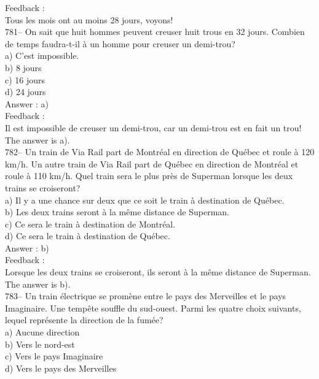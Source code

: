 ﻿\documentclass[letterpaper, 12pt]{article}
\begin{document}
Feedback : \\
Tous les mois ont au moins 28 jours, voyons!  \\

781-- On sait que huit hommes peuvent creuser huit trous en 32 jours.
Combien de temps faudra-t-il \`a un homme pour creuser un demi-trou?\\
a) C'est impossible.\\
b) 8 jours\\
c) 16 jours\\
d) 24 jours\\

Answer : a)\\

Feedback : \\
Il est impossible de creuser un demi-trou, car un demi-trou est en fait un
trou!  The answer is a).\\

782-- Un train de Via Rail part de Montr\'eal en direction de Qu\'ebec et
roule \`a 120 km/h.  Un autre train de Via Rail part de Qu\'ebec en
direction de Montr\'eal et roule \`a 110 km/h.  Quel train sera le plus
pr\`es de Superman lorsque les deux trains  se croiseront?\\
a) Il y a une chance sur deux que ce soit le train \`a destination de
Qu\'ebec.\\
b) Les deux trains seront \`a la m\^eme distance de Superman.\\
c) Ce sera le train \`a destination de Montr\'eal.\\
d) Ce sera le train \`a destination de Qu\'ebec.\\

Answer : b)\\

Feedback : \\
Lorsque les deux trains se croiseront, ils seront \`a la m\^eme distance de
Superman.  The answer is b).\\

783-- Un train \'electrique se prom\`ene entre le pays des Merveilles et le
pays Imaginaire.  Une temp\^ete souffle du sud-ouest.  Parmi les quatre
choix suivants, lequel repr\'esente la direction de la fum\'ee?\\
a) Aucune direction\\
b) Vers le nord-est\\
c) Vers le pays Imaginaire\\
d) Vers le pays des Merveilles\\
\end{document}
